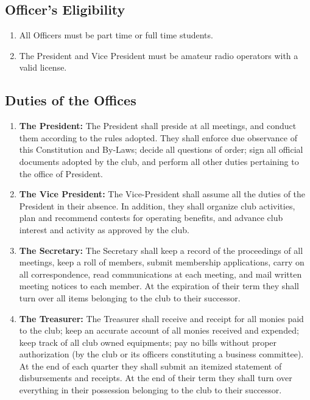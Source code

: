 \documentclass[a4paper,12pt]{article}
\begin{document}
\subsection{Officer's Eligibility}
\begin{enumerate}
  \item All Officers must be part time or full time students.
  \item The President and Vice President must be amateur radio operators with a valid license.
\end{enumerate}

\subsection{Duties of the Offices}
\begin{enumerate}
  \item \textbf{The President:} The President shall preside at all meetings, and conduct them according to the rules adopted. They shall enforce due observance of this Constitution and By-Laws; decide all questions of order; sign all official documents adopted by the club, and perform all other duties pertaining to the office of President.
  \item \textbf{The Vice President:} The Vice-President shall assume all the duties of the President in their absence. In addition, they shall organize club activities, plan and recommend contests for operating benefits, and advance club interest and activity as approved by the club.
  \item \textbf{The Secretary:} The Secretary shall keep a record of the proceedings of all meetings, keep a roll of members, submit
membership applications, carry on all correspondence, read communications at each meeting, and
mail written meeting notices to each member. At the expiration of their term they shall turn over
all items belonging to the club to their successor.
  \item \textbf{The Treasurer:} The Treasurer shall receive and receipt for all monies paid to the club;
  keep an accurate account of all monies received and expended;
  keep track of all club owned equipments;
  pay no bills without proper authorization (by the club or its officers constituting a business committee). At the end of each quarter they shall submit an itemized statement of disbursements and receipts. At the end of their term they shall turn over everything in their possession belonging to the club to their successor.
\end{enumerate}
\end{document}
